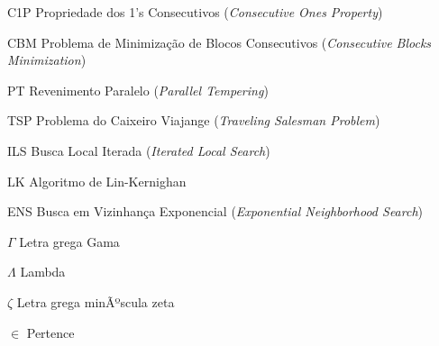 \documentclass[
	12pt,				%
	openany,			%
	oneside,			%
	a4paper,			%
	english,			%
	french,				%
	spanish,			%
	brazil				%
	]{abntex2}
\begin{document}
\listoffigures*
\cleardoublepage

\listoftables*
\cleardoublepage

\begin{siglas}
	\item[C1P]  Propriedade dos 1's Consecutivos (\textit{Consecutive Ones Property})
	\item[CBM]  Problema de Minimização de Blocos Consecutivos (\textit{Consecutive Blocks Minimization})
	\item[PT]   Revenimento Paralelo (\textit{Parallel Tempering})
    \item[TSP]  Problema do Caixeiro Viajange (\textit{Traveling Salesman Problem})
    \item[ILS]  Busca Local Iterada (\textit{Iterated Local Search})
    \item[LK]   Algoritmo de Lin-Kernighan
    \item[ENS] Busca em Vizinhança Exponencial (\textit{Exponential Neighborhood Search})
\end{siglas}

\begin{simbolos}
	\item[$ \Gamma $] Letra grega Gama
	\item[$ \Lambda $] Lambda
	\item[$ \zeta $] Letra grega minÃºscula zeta
	\item[$ \in $] Pertence
\end{simbolos}

\tableofcontents*
\cleardoublepage










\printindex
\end{document}
